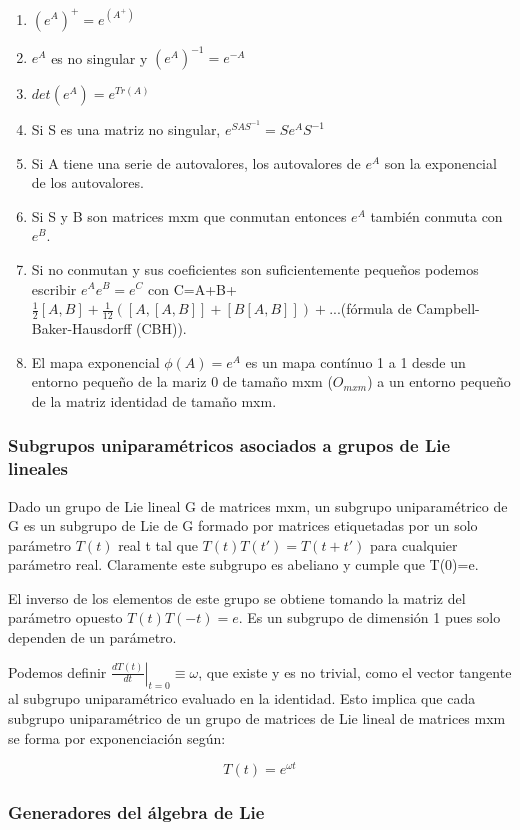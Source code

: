 \documentclass{article}
\begin{document}
\begin{enumerate}
\item $(e^A)^+=e^{(A^+)}$
\item $e^A$ es no singular y $(e^A)^{-1}=e^{-A}$
\item $det(e^{A}) = e^{Tr(A)}$
\item Si S es una matriz no singular, $e^{SAS^{-1}}=Se^{A}S^{-1}$
\item Si A tiene una serie de autovalores, los autovalores de $e^{A}$ son la exponencial de los autovalores.
\item Si S y B son matrices mxm que conmutan entonces $e^{A}$ también conmuta con $e^B$.
\item Si no conmutan y sus coeficientes son suficientemente pequeños podemos escribir $e^Ae^B=e^C$ con C=A+B+$\frac{1}{2}[A,B]+\frac{1}{12}([A,[A,B]]+[B[A,B]])+... $(fórmula de Campbell-Baker-Hausdorff (CBH)).
\item El mapa exponencial $\phi (A)=e^A$ es un mapa contínuo 1 a 1 desde un entorno pequeño de la mariz 0 de tamaño mxm ($O_{mxm}$) a un entorno pequeño de la matriz identidad de tamaño mxm.
\end{enumerate}

\subsubsection{Subgrupos uniparamétricos asociados a grupos de Lie lineales}

Dado un grupo de Lie lineal G de matrices mxm, un subgrupo uniparamétrico de G es un subgrupo de Lie de G formado por matrices etiquetadas por un solo parámetro $T(t)$ real t tal que $T(t)T(t')=T(t+t')$ para cualquier parámetro real. Claramente este subgrupo es abeliano y cumple que T(0)=e.

\smallskip
El inverso de los elementos de este grupo se obtiene tomando la matriz del parámetro opuesto $T(t)T(-t)=e$. Es un subgrupo de dimensión 1 pues solo dependen de un parámetro.

\smallskip
Podemos definir $\left . \frac{dT(t)}{dt}\right |_{t=0}\equiv \omega$, que existe y es no trivial, como el vector tangente al subgrupo uniparamétrico evaluado en la identidad. Esto implica que cada subgrupo uniparamétrico de un grupo de matrices de Lie lineal de matrices mxm se forma por exponenciación según:

$$T(t)=e^{\omega t}$$

\subsubsection{Generadores del álgebra de Lie}
\end{document}
